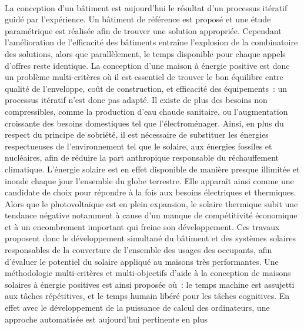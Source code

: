 \paragraph{} %
La conception d’un bâtiment est aujourd’hui le résultat d’un processus itératif guidé par
l’expérience. Un bâtiment de référence est proposé et une étude paramétrique est réalisée
afin de trouver une solution appropriée. Cependant l’amélioration de l’efficacité des
bâtiments entraîne l’explosion de la combinatoire des solutions, alors que parallèlement,
le temps disponible pour chaque appels d’offres reste identique. La conception d’une
maison à énergie positive est donc un problème multi-critères où il est essentiel de
trouver le bon équilibre entre qualité de l’enveloppe, coût de construction, et efficacité
des équipements~: un processus itératif n’est donc pas adapté. Il existe de plus des
besoins non compressibles, comme la production d’eau chaude sanitaire, ou l’augmentation
croissante des besoins domestiques tel que l’électroménager. Ainsi, en plus du respect du
principe de sobriété, il est nécessaire de substituer les énergies respectueuses de
l’environnement tel que le solaire, aux énergies fossiles et nucléaires, afin de réduire la
part anthropique responsable du réchauffement climatique. L’énergie solaire est en effet
disponible de manière presque illimitée et inonde chaque jour l’ensemble du globe
terrestre. Elle apparaît ainsi comme une candidate de choix pour répondre à la fois aux
besoins électriques et thermiques. Alors que le photovoltaïque est en plein expansion, le
solaire thermique subit une tendance négative notamment à cause d’un manque de
compétitivité économique et à un encombrement important qui freine son développement. Ces
travaux proposent donc le développement simultané du bâtiment et des systèmes solaires
responsables de la couverture de l’ensemble des usages des occupants, afin d’évaluer
le potentiel du solaire appliqué au maisons très performantes.
Une méthodologie multi-critères
et multi-objectifs d’aide à la conception de maisons solaires à énergie positives est
ainsi proposée où~: le temps machine est assujetti aux tâches répétitives, et le temps humain
libéré pour les tâches cognitives. En effet avec le développement de la puissance de
calcul des ordinateurs, une approche automatisée est aujourd’hui pertinente en plus
